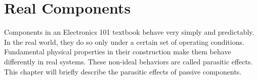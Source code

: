 \chapter{Real Components}

Components in an Electronics 101 textbook behave very simply and predictably. In the real world, they do so only under a certain set of operating conditions. Fundamental physical properties in their construction make them behave differently in real systems. These non-ideal behaviors are called parasitic effects. This chapter will briefly describe the parasitic effects of passive components.













